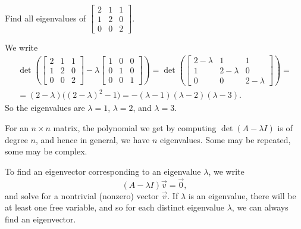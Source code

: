 \documentclass[12pt]{book}
\begin{document}
\begin{example}
Find all eigenvalues of 
$\left[ \begin{smallmatrix}
2 & 1 & 1 \\
1 & 2 & 0 \\
0 & 0 & 2
\end{smallmatrix} \right]$.

We write
\begin{multline*}
\det \left(
\begin{bmatrix}
2 & 1 & 1 \\
1 & 2 & 0 \\
0 & 0 & 2
\end{bmatrix}
- \lambda 
\begin{bmatrix}
1 & 0 & 0 \\
0 & 1 & 0 \\
0 & 0 & 1
\end{bmatrix}
\right)
=
\det \left(
\begin{bmatrix}
2-\lambda & 1 & 1 \\
1 & 2-\lambda & 0 \\
0 & 0 & 2-\lambda
\end{bmatrix}
\right)
= \\
=
(2-\lambda) \bigl({(2-\lambda)}^2 - 1\bigr)
= 
-(\lambda -1)(\lambda -2)(\lambda-3) .
\end{multline*}
So the eigenvalues are $\lambda = 1$, $\lambda = 2$, and
$\lambda = 3$.
\end{example}

For an $n \times n$ matrix, the polynomial we get by
computing $\det(A - \lambda I)$ is of degree $n$, and hence
in general, we have $n$ eigenvalues.  Some may be repeated, some may be
complex.

\medskip

To find an eigenvector corresponding to an eigenvalue $\lambda$, we write
\begin{equation*}
(A-\lambda I) \vec{v} = \vec{0} ,
\end{equation*}
and solve for a nontrivial (nonzero) vector $\vec{v}$.
If $\lambda$ is an eigenvalue, there will be at least one
free variable, and so
for
each distinct eigenvalue $\lambda$, we can always find an eigenvector.
\end{document}
